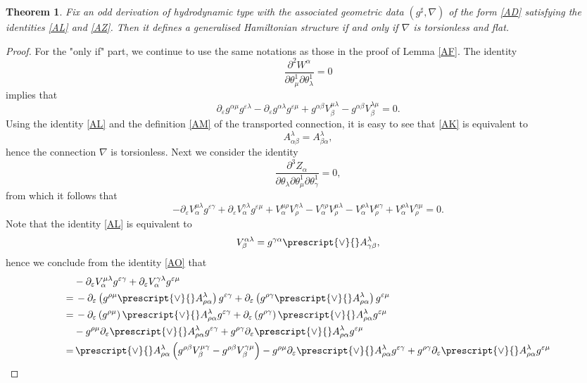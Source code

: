 \documentclass[11pt,a4paper]{amsart}
\numberwithin{equation}{section}
\newtheorem{theorem}{Theorem}[section]
\newcommand{\qa}{\alpha}
\newcommand{\qb}{\beta}
\newcommand{\qg}{\gamma}
\newcommand{\qth}{\theta}
\newcommand{\qe}{\varepsilon}
\newcommand{\qp}{\partial}
\newcommand{\ql}{\lambda}
\newcommand{\kk}[1]{\left(#1\right)}
\numberwithin{equation}{section}
\begin{document}
\begin{theorem}
  \label{AQ}
  Fix an odd derivation of hydrodynamic type with the associated geometric data $(g^\sharp,\nabla)$ of the form \eqref{AD} satisfying the identities \eqref{AL} and \eqref{AZ}. Then it defines a generalised Hamiltonian structure if and only if $\nabla$ is torsionless and flat. 
\end{theorem}
\begin{proof}
  For the "only if" part, we continue to use the same notations as those in the proof of Lemma \ref{AF}. 
  The identity
\[
\frac{\qp^2W^\qa}{\qp\qth_\mu^1\qp\qth_\ql^1} = 0
\]
implies that 
\begin{equation}
    \label{AK}
\qp_\qe g^{\qa\mu}g^{\qe\ql}-\qp_\qe g^{\qa\ql}g^{\qe\mu}+g^{\qa\qb}V^{\mu\ql}_\qb -g^{\qa\qb}V^{\ql\mu}_\qb = 0. 
\end{equation}
Using the identity \eqref{AL} and the definition \eqref{AM} of the transported connection, it is easy to see that \eqref{AK} is equivalent to 
\[
A^\ql_{\qa\qb} = A^\ql_{\qb\qa},
\]
hence the connection $\nabla$ is torsionless. Next we consider the identity
\[
\frac{\qp^3Z_\qa}{\qp\qth_\ql\qp\qth_\mu^1\qp\qth_\qg^1} = 0,
\]
from which it follows that 
\begin{equation}
\label{AO}
-\qp_\qe V^{\mu\ql}_\qa g^{\qe\qg}+\qp_\qe V^{\qg\ql}_\qa g^{\qe\mu}+V_\qa^{\mu\rho}V_\rho^{\qg\ql}-V_\qa^{\qg\rho}V_\rho^{\mu\ql}-V_\qa^{\rho\ql}V_\rho^{\mu\qg}+V_\qa^{\rho\ql}V_\rho^{\qg\mu} = 0.
\end{equation}
Note that the identity \eqref{AL} is equivalent to 
\begin{equation}
  \label{AP}
V^{\qa\ql}_\qb = g^{\qg\qa}\prescript{\vee}{}A^\ql_{\qg\qb},
\end{equation}
hence we conclude from the identity \eqref{AO} that 
\begin{align*}
    &-\qp_\qe V^{\mu\ql}_\qa g^{\qe\qg} +\qp_\qe V^{\qg\ql}_\qa g^{\qe\mu}\\
    =&\,  -\qp_\qe\kk{g^{\rho\mu}\prescript{\vee}{}A^\ql_{\rho\qa}}g^{\qe\qg} +\qp_\qe \kk{g^{\rho\qg}\prescript{\vee}{}A^\ql_{\rho\qa}} g^{\qe\mu}\\
=&\, -\qp_\qe\kk{g^{\rho\mu}}\prescript{\vee}{}A^\ql_{\rho\qa}g^{\qe\qg} +\qp_\qe \kk{g^{\rho\qg}}\prescript{\vee}{}A^\ql_{\rho\qa} g^{\qe\mu}\\
&-g^{\rho\mu}\qp_\qe \prescript{\vee}{}A^\ql_{\rho\qa}g^{\qe\qg} + g^{\rho\qg}\qp_\qe \prescript{\vee}{}A^\ql_{\rho\qa} g^{\qe\mu}\\
=&\,\prescript{\vee}{}A^\ql_{\rho\qa}\kk{g^{\rho\qb}V^{\mu\qg}_\qb -g^{\rho\qb}V^{\qg\mu}_\qb}-g^{\rho\mu}\qp_\qe \prescript{\vee}{}A^\ql_{\rho\qa}g^{\qe\qg} + g^{\rho\qg}\qp_\qe \prescript{\vee}{}A^\ql_{\rho\qa} g^{\qe\mu}\\

\end{align*}
\end{proof}
\end{document}
